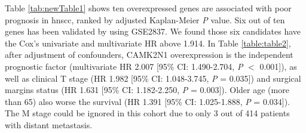 \documentclass[jpm,article,submit,moreauthors,pdftex]{Definitions/mdpi}
\begin{document}
\clearpage

Table %
\ref{tab:newTable1} shows ten overexpressed genes are associated with poor prognosis in \acrshort{hnscc}, ranked by adjusted Kaplan-Meier \textit{P} value.
Six out of ten genes has been validated by using GSE2837.
We found those six candidates have the Cox's univariate and multivariate HR above 1.914.
In Table \ref{table:table2}, %
after adjustment of confounders, \acrshort{CAMK2N1} overexpression is the independent prognostic factor (multivariate HR 2.007 [95\% CI: 1.490-2.704, \textit{P} $<$ 0.001]), as well as clinical T stage (HR 1.982 [95\% CI: 1.048-3.745, \textit{P} = 0.035]) and surgical margins status (HR 1.631 [95\% CI: 1.182-2.250, \textit{P} = 0.003]). 
Older age (more than 65) also worse the survival (HR 1.391 [95\% CI: 1.025-1.888, \textit{P} = 0.034]). 
The M stage could be ignored in this cohort due to only 3 out of 414 patients with distant metastasis.
\end{document}
